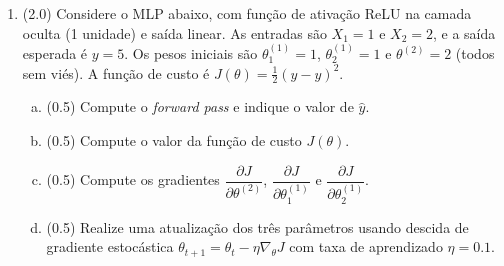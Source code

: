 \documentclass[11pt,a4paper]{article}
\begin{document}
\begin{enumerate}[1)]
\begin{enumerate}[a)]
    \item ( )\,V \quad ( )\,F \quad Inicializar todos os pesos de uma camada oculta com zero é adequado, pois o algoritmo de \textit{backpropagation} naturalmente quebra a simetria entre as unidades nas primeiras iterações da descida de gradiente.\\[0.2em]
    \rule{\linewidth}{0.4pt}\\[0.2em]
    \rule{\linewidth}{0.4pt}
\end{enumerate}

\pagebreak

\item (2.0) Considere o MLP abaixo, com função de ativação ReLU na camada oculta (1 unidade) e saída linear. As entradas são $X_1 = 1$ e $X_2 = 2$, e a saída esperada é $y = 5$. Os pesos iniciais são $\theta^{(1)}_1 = 1$, $\theta^{(1)}_2 = 1$ e $\theta^{(2)} = 2$ (todos sem viés). A função de custo é $J(\theta) = \tfrac{1}{2}(y - \hat{y})^2$.

\begin{center}
\end{center}

\begin{enumerate}[a)]
    \item (0.5) Compute o \textit{forward pass} e indique o valor de $\hat{y}$.
    \vspace{1.5cm}

    \item (0.5) Compute o valor da função de custo $J(\theta)$.
    \vspace{1.5cm}

    \item (0.5) Compute os gradientes $\dfrac{\partial J}{\partial \theta^{(2)}}$, $\dfrac{\partial J}{\partial \theta^{(1)}_1}$ e $\dfrac{\partial J}{\partial \theta^{(1)}_2}$.
    \vspace{3cm}

    \item (0.5) Realize uma atualização dos três parâmetros usando descida de gradiente estocástica $\theta_{t+1} = \theta_t - \eta \nabla_\theta J$ com taxa de aprendizado $\eta = 0.1$.
    \vspace{2cm}
\end{enumerate}

\end{enumerate}
\end{document}
